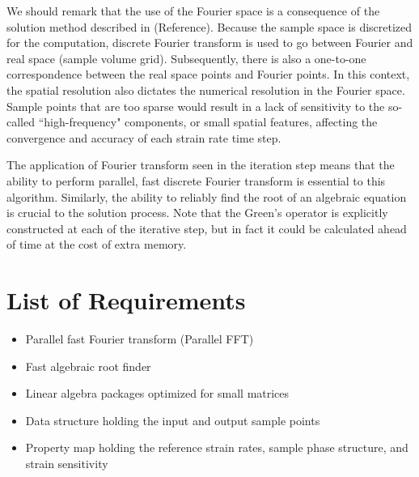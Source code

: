 \documentclass[11pt]{article}
\begin{document}
We should remark that the use of the Fourier space is a consequence of the solution method described in (Reference).  Because the sample space is discretized for the computation, discrete Fourier transform is used to go between Fourier and real space (sample volume grid).  Subsequently, there is also a one-to-one correspondence between the real space points and Fourier points.  In this context, the spatial resolution also dictates the numerical resolution in the Fourier space.  Sample points that are too sparse would result in a lack of sensitivity to the so-called ``high-frequency" components, or small spatial features, affecting the convergence and accuracy of each strain rate time step.

The application of Fourier transform seen in the iteration step means that the ability to perform parallel, fast discrete Fourier transform is essential to this algorithm.  Similarly, the ability to reliably find the root of an algebraic equation is crucial to the solution process.  Note that the Green's operator is explicitly constructed at each of the iterative step, but in fact it could be calculated ahead of time at the cost of extra memory.  



\section{List of Requirements}

\begin{itemize}
\item
	Parallel fast Fourier transform (Parallel FFT)
\item
	Fast algebraic root finder
\item
	Linear algebra packages optimized for small matrices 
\item
	Data structure holding the input and output sample points
\item
    Property map holding the reference strain rates, sample phase structure, and strain sensitivity
\end{itemize}
\end{document}
